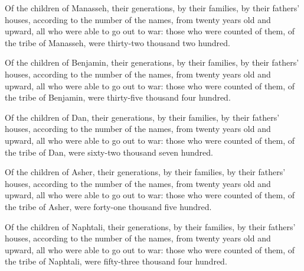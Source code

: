  Of the children of Manasseh, their generations, by their
families, by their fathers' houses, according to the number of the
names, from twenty years old and upward, all who were able to go out to
war:  those who were counted of them, of the tribe of
Manasseh, were thirty-two thousand two hundred.

 Of the children of Benjamin, their generations, by their
families, by their fathers' houses, according to the number of the
names, from twenty years old and upward, all who were able to go out to
war:  those who were counted of them, of the tribe of
Benjamin, were thirty-five thousand four hundred.

 Of the children of Dan, their generations, by their
families, by their fathers' houses, according to the number of the
names, from twenty years old and upward, all who were able to go out to
war:  those who were counted of them, of the tribe of
Dan, were sixty-two thousand seven hundred.

 Of the children of Asher, their generations, by their
families, by their fathers' houses, according to the number of the
names, from twenty years old and upward, all who were able to go out to
war:  those who were counted of them, of the tribe of
Asher, were forty-one thousand five hundred.

 Of the children of Naphtali, their generations, by their
families, by their fathers' houses, according to the number of the
names, from twenty years old and upward, all who were able to go out to
war:  those who were counted of them, of the tribe of
Naphtali, were fifty-three thousand four hundred.


